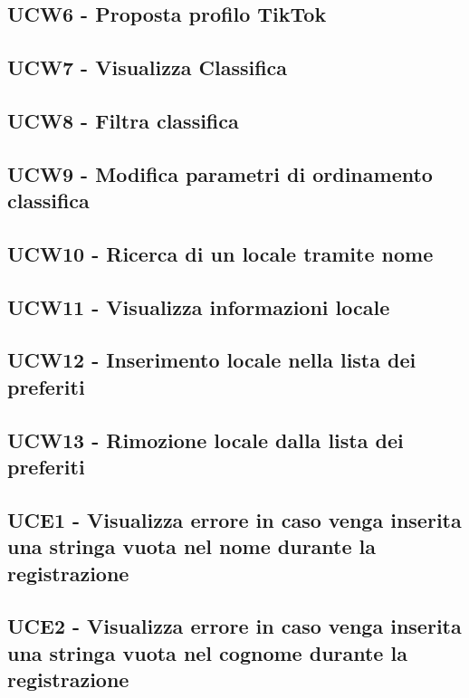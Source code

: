 \documentclass[a4paper]{article}
\begin{document}
	\subsection{UCW6 - Proposta profilo TikTok}
	
	
	\subsection{UCW7 - Visualizza Classifica}
	
	
	\subsection{UCW8 - Filtra classifica}
	
	
	\subsection{UCW9 - Modifica parametri di ordinamento classifica}
	
	
	\subsection{UCW10 - Ricerca di un locale tramite nome}
	
	
	\subsection{UCW11 - Visualizza informazioni locale}
	
	
	\subsection{UCW12 - Inserimento locale nella lista dei preferiti}
	
	
	\subsection{UCW13 - Rimozione locale dalla lista dei preferiti}
	

	\subsection{UCE1 - Visualizza errore in caso venga inserita una stringa vuota nel nome durante la registrazione}
	

	\subsection{UCE2 - Visualizza errore in caso venga inserita una stringa vuota nel cognome durante la registrazione}
		
	
\end{document}

